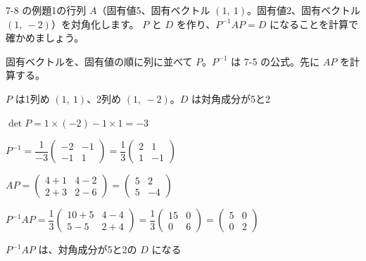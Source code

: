 \begin{reidai}
7-8 の例題1の行列 $A$（固有値5、固有ベクトル $(1,\ 1)$。固有値2、固有ベクトル $(1,\ -2)$）を対角化します。
$P$ と $D$ を作り、$P^{-1}AP=D$ になることを計算で確かめましょう。\par
\kangaekata 固有ベクトルを、固有値の順に列に並べて $P$。$P^{-1}$ は 7-5 の公式。先に $AP$ を計算する。\par
\shiki\kviijs{}\zw{} $P$ は1列め $(1,\ 1)$、2列め $(1,\ -2)$。$D$ は対角成分が5と2\par
\kviija $\det P=1\times(-2)-1\times1=-3$\par
\kviija $P^{-1}=\dfrac{1}{-3}\begin{pmatrix}-2&-1\\-1&1\end{pmatrix}=\dfrac13\begin{pmatrix}2&1\\1&-1\end{pmatrix}$\par
\kviija $AP=\begin{pmatrix}4+1&4-2\\2+3&2-6\end{pmatrix}=\begin{pmatrix}5&2\\5&-4\end{pmatrix}$\par
\kviija $P^{-1}AP=\dfrac13\begin{pmatrix}10+5&4-4\\5-5&2+4\end{pmatrix}=\dfrac13\begin{pmatrix}15&0\\0&6\end{pmatrix}=\begin{pmatrix}5&0\\0&2\end{pmatrix}$\par
\kotae\kviijs{}\zw{} $P^{-1}AP$ は、対角成分が5と2の $D$ になる
\end{reidai}

